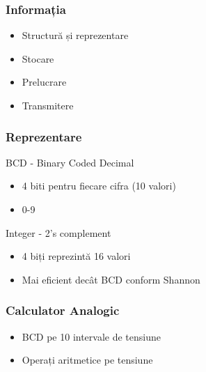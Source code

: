 
\begin{frame}
    \frametitle{Informația}
    \begin{itemize}
        \item Structură și reprezentare
        \item Stocare
        \item Prelucrare
        \item Transmitere
    \end{itemize}
    \note{
    }
\end{frame}

\begin{frame}
    \frametitle{Reprezentare}
    BCD - Binary Coded Decimal
    \begin{itemize}
        \item 4 biti pentru fiecare cifra (10 valori)
        \item 0-9
    \end{itemize}
    Integer - 2's complement
    \begin{itemize}
        \item 4 biți reprezintă 16 valori
        \item Mai eficient decât BCD conform Shannon
    \end{itemize}
    \note{
    }
\end{frame}

\begin{frame}
    \frametitle{Calculator Analogic}
    \begin{itemize}
        \item BCD pe 10 intervale de tensiune
        \item Operați aritmetice pe tensiune
    \end{itemize}
\end{frame}